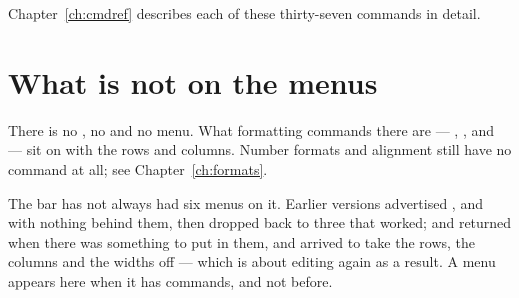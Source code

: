 \begin{ccfigure}
\caption{Every command on every menu}
\label{fig:menumap}
\end{ccfigure}

Chapter~\ref{ch:cmdref} describes each of these thirty-seven commands in detail.

\section{What is not on the menus}

There is no , no  and no  menu.
What formatting commands there are --- , ,
 and  --- sit on 
with the rows and columns. Number formats and alignment still have no command
at all; see Chapter~\ref{ch:formats}.

\begin{ccnote}
The bar has not always had six menus on it. Earlier versions advertised
,  and  with nothing behind them,
then dropped back to three that worked;  and 
returned when there was something to put in them, and  arrived
to take the rows, the columns and the widths off  --- which is
about editing again as a result. A menu appears here when it has commands, and
not before.
\end{ccnote}
